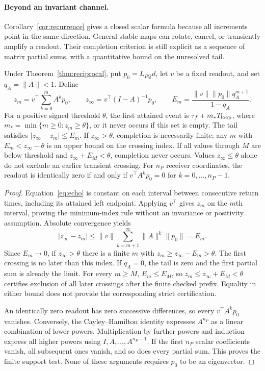 \paragraph{Beyond an invariant channel.} Corollary~\ref{cor:recurrence} gives a closed scalar formula because all increments point in the same direction. General stable maps can rotate, cancel, or transiently amplify a readout. Their completion criterion is still explicit as a sequence of matrix partial sums, with a quantitative bound on the unresolved tail.

\begin{proposition}\label{prop:generalpassage}
Under Theorem~\ref{thm:reciprocal}, put $p_0=L_{PQ}d$, let $v$ be a fixed readout, and set $q_A=\|A\|<1$. Define
\[
z_m=v^\top\sum_{k=0}^{m}A^kp_0,
\qquad z_\infty=v^\top(I-A)^{-1}p_0,
\qquad E_m=\frac{\|v\|\|p_0\|q_A^{m+1}}{1-q_A}.
\]
For a positive signed threshold $\theta$, the first attained event is $\tau_f+m_*T_{\rm loop}$, where $m_*=\min\{m\ge0:z_m\ge\theta\}$, or it never occurs if this set is empty. The tail satisfies $|z_\infty-z_m|\le E_m$. If $z_\infty>\theta$, completion is necessarily finite; any $m$ with $E_m<z_\infty-\theta$ is an upper bound on the crossing index. If all values through $M$ are below threshold and $z_\infty+E_M<\theta$, completion never occurs. Values $z_\infty\le\theta$ alone do not exclude an earlier transient crossing. For $n_P$ receiver coordinates, the readout is identically zero if and only if $v^\top A^kp_0=0$ for $k=0,\ldots,n_P-1$.
\end{proposition}
\begin{proof}
Equation~\eqref{eq:echo} is constant on each interval between consecutive return times, including its attained left endpoint. Applying $v^\top$ gives $z_m$ on the $m$th interval, proving the minimum-index rule without an invariance or positivity assumption. Absolute convergence yields
\[
|z_\infty-z_m|\le\|v\|\sum_{k=m+1}^{\infty}\|A\|^k\|p_0\|
=E_m.
\]
Since $E_m\to0$, if $z_\infty>\theta$ there is a finite $m$ with $z_m\ge z_\infty-E_m>\theta$. The first crossing is no later than this index. If $q_A=0$, the tail is zero and the first partial sum is already the limit. For every $m\ge M$, $E_m\le E_M$, so $z_m\le z_\infty+E_M<\theta$ certifies exclusion of all later crossings after the finite checked prefix. Equality in either bound does not provide the corresponding strict certification.

An identically zero readout has zero successive differences, so every $v^\top A^kp_0$ vanishes. Conversely, the Cayley--Hamilton identity expresses $A^{n_P}$ as a linear combination of lower powers. Multiplication by further powers and induction express all higher powers using $I,A,\ldots,A^{n_P-1}$. If the first $n_P$ scalar coefficients vanish, all subsequent ones vanish, and so does every partial sum. This proves the finite support test. None of these arguments requires $p_0$ to be an eigenvector.
\end{proof}

